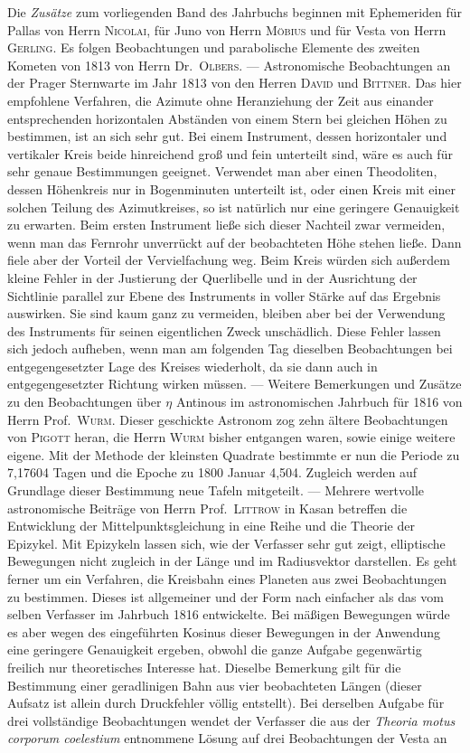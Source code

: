 Die \emph{Zusätze} zum vorliegenden Band des Jahrbuchs beginnen mit Ephemeriden für Pallas von Herrn \textsc{Nicolai}, für Juno von Herrn \textsc{Möbius} und für Vesta von Herrn \textsc{Gerling}. Es folgen Beobachtungen und parabolische Elemente des zweiten Kometen von 1813 von Herrn Dr.\ \textsc{Olbers}. --- Astronomische Beobachtungen an der Prager Sternwarte im Jahr 1813 von den Herren \textsc{David} und \textsc{Bittner}. Das hier empfohlene Verfahren, die Azimute ohne Heranziehung der Zeit aus einander entsprechenden horizontalen Abständen von einem Stern bei gleichen Höhen zu bestimmen, ist an sich sehr gut. Bei einem Instrument, dessen horizontaler und vertikaler Kreis beide hinreichend groß und fein unterteilt sind, wäre es auch für sehr genaue Bestimmungen geeignet. Verwendet man aber einen Theodoliten, dessen Höhenkreis nur in Bogenminuten unterteilt ist, oder einen Kreis mit einer solchen Teilung des Azimutkreises, so ist natürlich nur eine geringere Genauigkeit zu erwarten. Beim ersten Instrument ließe sich dieser Nachteil zwar vermeiden, wenn man das Fernrohr unverrückt auf der beobachteten Höhe stehen ließe. Dann fiele aber der Vorteil der Vervielfachung weg. Beim Kreis würden sich außerdem kleine Fehler in der Justierung der Querlibelle und in der Ausrichtung der Sichtlinie parallel zur Ebene des Instruments in voller Stärke auf das Ergebnis auswirken. Sie sind kaum ganz zu vermeiden, bleiben aber bei der Verwendung des Instruments für seinen eigentlichen Zweck unschädlich. Diese Fehler lassen sich jedoch aufheben, wenn man am folgenden Tag dieselben Beobachtungen bei entgegengesetzter Lage des Kreises wiederholt, da sie dann auch in entgegengesetzter Richtung wirken müssen. --- Weitere Bemerkungen und Zusätze zu den Beobachtungen über $\eta$ Antinous im astronomischen Jahrbuch für 1816 von Herrn Prof.\ \textsc{Wurm}. Dieser geschickte Astronom zog zehn ältere Beobachtungen von \textsc{Pigott} heran, die Herrn \textsc{Wurm} bisher entgangen waren, sowie einige weitere eigene. Mit der Methode der kleinsten Quadrate bestimmte er nun die Periode zu 7,17604 Tagen und die Epoche zu 1800 Januar 4,504. Zugleich werden auf Grundlage dieser Bestimmung neue Tafeln mitgeteilt. --- Mehrere wertvolle astronomische Beiträge von Herrn Prof.\ \textsc{Littrow} in Kasan betreffen die Entwicklung der Mittelpunktsgleichung in eine Reihe und die Theorie der Epizykel. Mit Epizykeln lassen sich, wie der Verfasser sehr gut zeigt, elliptische Bewegungen nicht zugleich in der Länge und im Radiusvektor darstellen. Es geht ferner um ein Verfahren, die Kreisbahn eines Planeten aus zwei Beobachtungen zu bestimmen. Dieses ist allgemeiner und der Form nach einfacher als das vom selben Verfasser im Jahrbuch 1816 entwickelte. Bei mäßigen Bewegungen würde es aber wegen des eingeführten Kosinus dieser Bewegungen in der Anwendung eine geringere Genauigkeit ergeben, obwohl die ganze Aufgabe gegenwärtig freilich nur theoretisches Interesse hat. Dieselbe Bemerkung gilt für die Bestimmung einer geradlinigen Bahn aus vier beobachteten Längen (dieser Aufsatz ist allein durch Druckfehler völlig entstellt). Bei derselben Aufgabe für drei vollständige Beobachtungen wendet der Verfasser die aus der \emph{Theoria motus corporum coelestium} entnommene Lösung auf drei Beobachtungen der Vesta an 